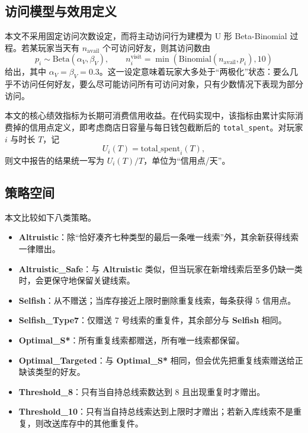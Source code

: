 \documentclass{rubbish}
\begin{document}
\begin{rubbishbody}
\subsection{访问模型与效用定义}

本文不采用固定访问次数设定，而将主动访问行为建模为 U 形 Beta-Binomial 过程。若某玩家当天有 $n_{\mathrm{avail}}$ 个可访问好友，则其访问数由
\begin{equation}
p_i \sim \mathrm{Beta}(\alpha_V,\beta_V), \qquad
n_i^{\mathrm{visit}} = \min\!\left(\mathrm{Binomial}(n_{\mathrm{avail}}, p_i), 10\right)
\end{equation}
给出，其中 $\alpha_V = \beta_V = 0.3$。这一设定意味着玩家大多处于“两极化”状态：要么几乎不访问任何好友，要么尽可能访问所有可访问对象，只有少数情况下表现为部分访问。

本文的核心绩效指标为长期可消费信用收益。在代码实现中，该指标由累计实际消费掉的信用点定义，即考虑商店日容量与每日钱包截断后的 \texttt{total\_spent}。对玩家 $i$ 与时长 $T$，记
\begin{equation}
U_i(T) = \mathrm{total\_spent}_i(T),
\end{equation}
则文中报告的结果统一写为 $U_i(T)/T$，单位为“信用点/天”。

\subsection{策略空间}

本文比较如下八类策略。

\begin{itemize}[leftmargin=*, itemsep=2pt]
  \item \textbf{Altruistic}：除“恰好凑齐七种类型的最后一条唯一线索”外，其余新获得线索一律赠出。
  \item \textbf{Altruistic\_Safe}：与 \textbf{Altruistic} 类似，但当玩家在新增线索后至多仍缺一类时，会更保守地保留关键线索。
  \item \textbf{Selfish}：从不赠送；当库存接近上限时删除重复线索，每条获得 5 信用点。
  \item \textbf{Selfish\_Type7}：仅赠送 7 号线索的重复件，其余部分与 \textbf{Selfish} 相同。
  \item \textbf{Optimal\_S*}：所有重复线索都赠送，所有唯一线索都保留。
  \item \textbf{Optimal\_Targeted}：与 \textbf{Optimal\_S*} 相同，但会优先把重复线索赠送给正缺该类型的好友。
  \item \textbf{Threshold\_8}：只有当自持总线索数达到 8 且出现重复时才赠出。
  \item \textbf{Threshold\_10}：只有当自持总线索达到上限时才赠出；若新入库线索不是重复，则改送库存中的其他重复件。
\end{itemize}


\end{rubbishbody}
\end{document}
